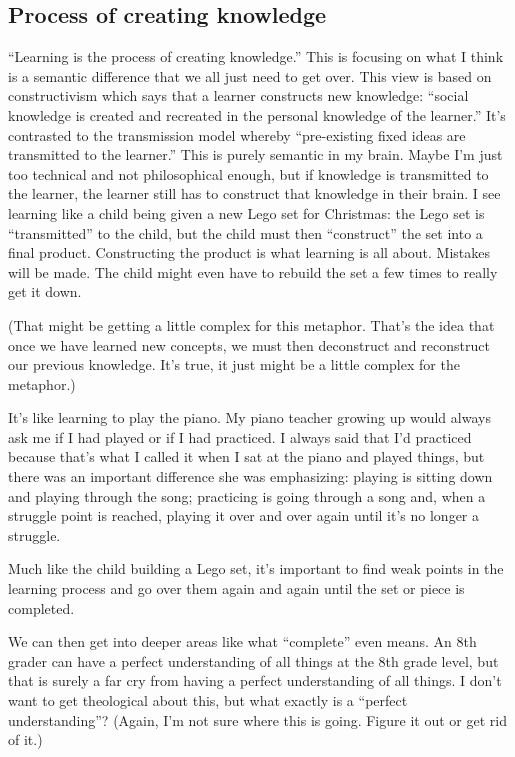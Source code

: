 \documentclass[man,natbib]{apa6}
\begin{document}
\subsection{Process of creating knowledge}
``Learning is the process of creating knowledge.'' This is focusing on what I think is a semantic difference that we all just need to get over. This view is based on constructivism which says that a learner constructs new knowledge: ``social knowledge is created and recreated in the personal knowledge of the learner.'' It's contrasted to the transmission model whereby ``pre-existing fixed ideas are transmitted to the learner.'' This is purely semantic in my brain. Maybe I'm just too technical and not philosophical enough, but if knowledge is transmitted to the learner, the learner still has to construct that knowledge in their brain. I see learning like a child being given a new Lego set for Christmas: the Lego set is ``transmitted'' to the child, but the child must then ``construct'' the set into a final product. Constructing the product is what learning is all about. Mistakes will be made. The child might even have to rebuild the set a few times to really get it down.

(That might be getting a little complex for this metaphor. That's the idea that once we have learned new concepts, we must then deconstruct and reconstruct our previous knowledge. It's true, it just might be a little complex for the metaphor.)

It's like learning to play the piano. My piano teacher growing up would always ask me if I had played or if I had practiced. I always said that I'd practiced because that's what I called it when I sat at the piano and played things, but there was an important difference she was emphasizing: playing is sitting down and playing through the song; practicing is going through a song and, when a struggle point is reached, playing it over and over again until it's no longer a struggle.

Much like the child building a Lego set, it's important to find weak points in the learning process and go over them again and again until the set or piece is completed.

We can then get into deeper areas like what ``complete'' even means. An 8th grader can have a perfect understanding of all things at the 8th grade level, but that is surely a far cry from having a perfect understanding of all things. I don't want to get theological about this, but what exactly is a ``perfect understanding''? (Again, I'm not sure where this is going. Figure it out or get rid of it.)
\end{document}
